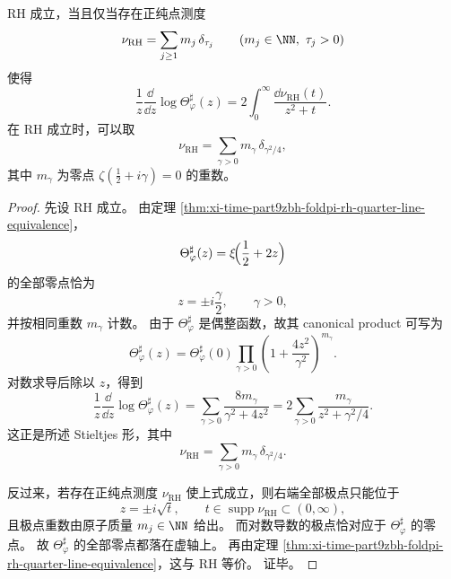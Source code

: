 \begin{theorem}\label{thm:xi-time-part9zbh-foldpi-stieltjes-log-derivative-criterion}
RH 成立，当且仅当存在正纯点测度
\[
\nu_{\mathrm{RH}}
=
\sum_{j\ge 1}m_j\,\delta_{\tau_j}
\qquad
(m_j\in\NN,\ \tau_j>0)
\]
使得
\[
\frac1z\frac{\dd}{\dd z}\log \Theta_\varphi^\sharp(z)
=
2\int_0^\infty \frac{\dd\nu_{\mathrm{RH}}(t)}{z^2+t}.
\]
在 RH 成立时，可以取
\[
\nu_{\mathrm{RH}}
=
\sum_{\gamma>0}m_\gamma\,\delta_{\gamma^2/4},
\]
其中 \(m_\gamma\) 为零点 \(\zeta(\frac12+i\gamma)=0\) 的重数。
\end{theorem}
\begin{proof}
先设 RH 成立。
由定理 \ref{thm:xi-time-part9zbh-foldpi-rh-quarter-line-equivalence}，
\[
\Theta_\varphi^\sharp(z)=\xi\!\Bigl(\frac12+2z\Bigr)
\]
的全部零点恰为
\[
z=\pm i\frac{\gamma}{2},
\qquad
\gamma>0,
\]
并按相同重数 \(m_\gamma\) 计数。
由于 \(\Theta_\varphi^\sharp\) 是偶整函数，故其 canonical product 可写为
\[
\Theta_\varphi^\sharp(z)
=
\Theta_\varphi^\sharp(0)
\prod_{\gamma>0}\left(1+\frac{4z^2}{\gamma^2}\right)^{m_\gamma}.
\]
对数求导后除以 \(z\)，得到
\[
\frac1z\frac{\dd}{\dd z}\log \Theta_\varphi^\sharp(z)
=
\sum_{\gamma>0}\frac{8m_\gamma}{\gamma^2+4z^2}
=
2\sum_{\gamma>0}\frac{m_\gamma}{z^2+\gamma^2/4}.
\]
这正是所述 Stieltjes 形，其中
\[
\nu_{\mathrm{RH}}
=
\sum_{\gamma>0}m_\gamma\,\delta_{\gamma^2/4}.
\]

反过来，若存在正纯点测度 \(\nu_{\mathrm{RH}}\) 使上式成立，则右端全部极点只能位于
\[
z=\pm i\sqrt t,
\qquad
t\in \operatorname{supp}\nu_{\mathrm{RH}}\subset (0,\infty),
\]
且极点重数由原子质量 \(m_j\in\NN\) 给出。
而对数导数的极点恰对应于 \(\Theta_\varphi^\sharp\) 的零点。
故 \(\Theta_\varphi^\sharp\) 的全部零点都落在虚轴上。
再由定理 \ref{thm:xi-time-part9zbh-foldpi-rh-quarter-line-equivalence}，这与 RH 等价。
证毕。
\end{proof}

